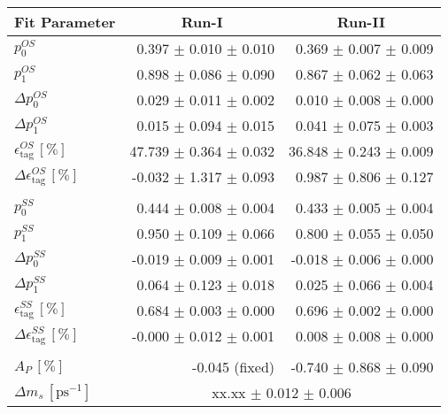 \begin{tabular}{l r r } 
\hline
\hline
\multicolumn{1}{c}{Fit Parameter} & \multicolumn{1}{c}{Run-I} & \multicolumn{1}{c}{Run-II}  \\ 
\hline
$p_{0}^{OS}$ & 0.397 $\pm$ 0.010 $\pm$ 0.010 & 0.369 $\pm$ 0.007 $\pm$ 0.009 \\ 
$p_{1}^{OS}$ & 0.898 $\pm$ 0.086 $\pm$ 0.090 & 0.867 $\pm$ 0.062 $\pm$ 0.063 \\ 
$\Delta p_{0}^{OS}$ & 0.029 $\pm$ 0.011 $\pm$ 0.002 & 0.010 $\pm$ 0.008 $\pm$ 0.000 \\ 
$\Delta p_{1}^{OS}$ & 0.015 $\pm$ 0.094 $\pm$ 0.015 & 0.041 $\pm$ 0.075 $\pm$ 0.003 \\ 
$\epsilon_{\text{tag}}^{OS} \, [\%]$ & 47.739 $\pm$ 0.364 $\pm$ 0.032 & 36.848 $\pm$ 0.243 $\pm$ 0.009 \\ 
$\Delta \epsilon_{\text{tag}}^{OS} \, [\%]$ & -0.032 $\pm$ 1.317 $\pm$ 0.093 & 0.987 $\pm$ 0.806 $\pm$ 0.127 \\ 
 \\ 
$p_{0}^{SS}$ & 0.444 $\pm$ 0.008 $\pm$ 0.004 & 0.433 $\pm$ 0.005 $\pm$ 0.004 \\ 
$p_{1}^{SS}$ & 0.950 $\pm$ 0.109 $\pm$ 0.066 & 0.800 $\pm$ 0.055 $\pm$ 0.050 \\ 
$\Delta p_{0}^{SS}$ & -0.019 $\pm$ 0.009 $\pm$ 0.001 & -0.018 $\pm$ 0.006 $\pm$ 0.000 \\ 
$\Delta p_{1}^{SS}$ & 0.064 $\pm$ 0.123 $\pm$ 0.018 & 0.025 $\pm$ 0.066 $\pm$ 0.004 \\ 
$\epsilon_{\text{tag}}^{SS} \, [\%]$ & 0.684 $\pm$ 0.003 $\pm$ 0.000 & 0.696 $\pm$ 0.002 $\pm$ 0.000 \\ 
$\Delta \epsilon_{\text{tag}}^{SS} \, [\%]$ & -0.000 $\pm$ 0.012 $\pm$ 0.001 & 0.008 $\pm$ 0.008 $\pm$ 0.000 \\ 
 \\ 
$A_{P} \, [\%]$ & -0.045 (fixed) & -0.740 $\pm$ 0.868 $\pm$ 0.090 \\ 
\hline
$\Delta m_{s} \, [\text{ps}^{-1}]$ & \multicolumn{2}{c}{ xx.xx $\pm$ 0.012 $\pm$ 0.006 }  \\ 
\hline
\hline
\end{tabular}

